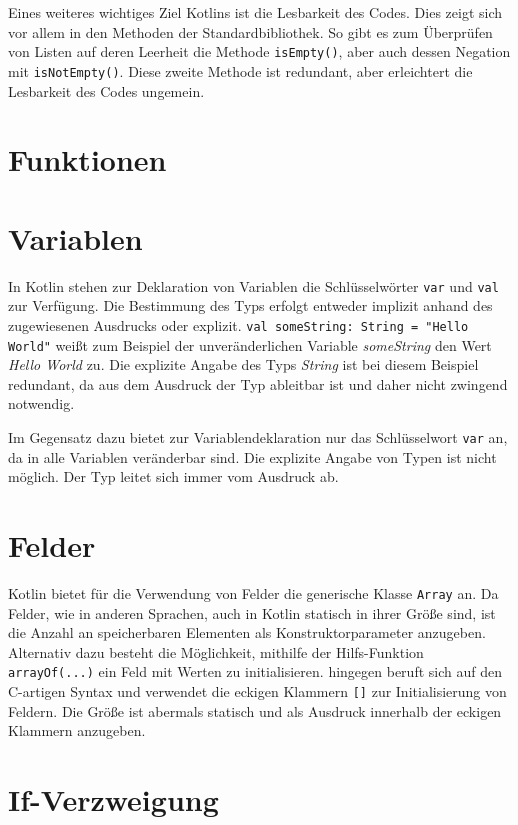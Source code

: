 Eines weiteres wichtiges Ziel Kotlins ist die Lesbarkeit des Codes. Dies zeigt sich vor allem in den Methoden der Standardbibliothek. So gibt es zum Überprüfen von Listen auf deren Leerheit die Methode \texttt{isEmpty()}, aber auch dessen Negation mit \texttt{isNotEmpty()}. Diese zweite Methode ist redundant, aber erleichtert die Lesbarkeit des Codes ungemein.

\section{Funktionen}

\section{Variablen}

In Kotlin stehen zur Deklaration von Variablen die Schlüsselwörter \texttt{var} und \texttt{val} zur Verfügung. Die Bestimmung des Typs erfolgt entweder implizit anhand des zugewiesenen Ausdrucks oder explizit. \texttt{val someString: String = "Hello World"} weißt zum Beispiel der unveränderlichen Variable \textit{someString} den Wert \textit{Hello World} zu. Die explizite Angabe des Typs \textit{String} ist bei diesem Beispiel redundant, da aus dem Ausdruck der Typ ableitbar ist und daher nicht zwingend notwendig.

\toya Im Gegensatz dazu bietet \toya zur Variablendeklaration nur das Schlüsselwort \texttt{var} an, da in \toya alle Variablen veränderbar sind. Die explizite Angabe von Typen ist nicht möglich. Der Typ leitet sich immer vom Ausdruck ab.

\section{Felder}

Kotlin bietet für die Verwendung von Felder die generische Klasse \texttt{Array} an. Da Felder, wie in anderen Sprachen, auch in Kotlin statisch in ihrer Größe sind, ist die Anzahl an speicherbaren Elementen als Konstruktorparameter anzugeben. Alternativ dazu besteht die Möglichkeit, mithilfe der Hilfs-Funktion \texttt{arrayOf(...)} ein Feld mit Werten zu initialisieren. \toya hingegen beruft sich auf den C-artigen Syntax und verwendet die eckigen Klammern \texttt{[]} zur Initialisierung von Feldern. Die Größe ist abermals statisch und als Ausdruck innerhalb der eckigen Klammern anzugeben.

\section{If-Verzweigung}


